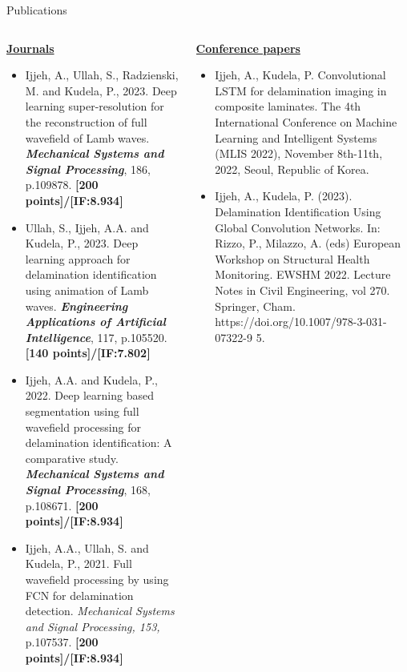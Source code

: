 \documentclass[10pt,aspectratio=169,dvipsnames]{beamer} %
\begin{document}
	\begin{frame}{Publications}
		\vspace{5pt}
		\begin{tiny}					
			\begin{columns}[T]
				\begin{column}[t]{0.48\textwidth}
					\underline{\textbf{Journals}}
					\begin{itemize}
						\justifying
						\item Ijjeh, A., Ullah, S., Radzienski, M. and Kudela, P., 2023. Deep learning super-resolution for the reconstruction of full wavefield of Lamb waves. \textbf{\textit{Mechanical Systems and Signal Processing}}, 186, p.109878.
						\textbf{[200 points]/[IF:8.934]}
						\item Ullah, S., Ijjeh, A.A. and Kudela, P., 2023. Deep learning approach for delamination identification using animation of Lamb waves. 
						\textbf{\textit{Engineering Applications of Artificial Intelligence}}, 117, p.105520.		
						\textbf{[140 points]/[IF:7.802]}
						\item Ijjeh, A.A. and Kudela, P., 2022. Deep learning based segmentation using full wavefield processing for delamination identification: A comparative study. \textbf{\textit{Mechanical Systems and Signal Processing}}, 168, p.108671.
						\textbf{[200 points]/[IF:8.934]}
						\item Ijjeh, A.A., Ullah, S. and Kudela, P., 2021. Full wavefield processing by using FCN for delamination detection. \textit{Mechanical Systems and Signal Processing, 153,} p.107537.		
						\textbf{[200 points]/[IF:8.934]}			
					\end{itemize}					
				\end{column}
				\begin{column}[t]{0.48\textwidth}
					\underline{\textbf{Conference papers}}
					\begin{itemize}
						\justifying
						\item {Ijjeh, A.}, Kudela, P. Convolutional LSTM for delamination imaging in composite laminates. 
						The 4th International Conference on Machine Learning and Intelligent Systems (MLIS 2022), November 8th-11th, 2022, Seoul, Republic of Korea.
						\item {Ijjeh, A.}, Kudela, P. (2023). Delamination Identification Using Global Convolution Networks. In: Rizzo,
						P., Milazzo, A. (eds) European Workshop on Structural Health Monitoring. EWSHM 2022. Lecture Notes
						in Civil Engineering, vol 270. Springer, Cham. https://doi.org/10.1007/978-3-031-07322-9 5.		

\end{itemize}
\end{column}
\end{columns}
\end{tiny}
\end{frame}
\end{document}
